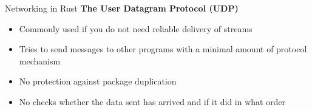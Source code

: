 \begin{frame}{Networking in Rust}
    \textbf{The User Datagram Protocol (UDP)}

    \begin{itemize}
        \item<2-> Commonly used if you do not need reliable delivery of streams
        \item<3-> Tries to send messages to other programs with a minimal amount of protocol mechanism
        \item<4-> No protection against package duplication
        \item<5> No checks whether the data sent has arrived and if it did in what order
    \end{itemize}

\end{frame}

